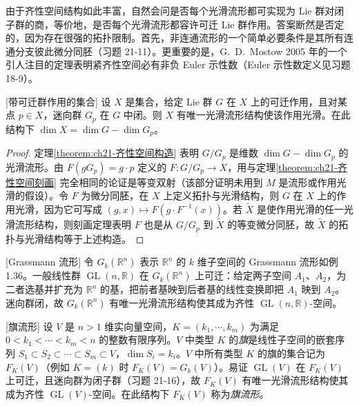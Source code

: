 \documentclass[../../main.tex]{subfiles}
\begin{document}
由于齐性空间结构如此丰富，自然会问是否每个光滑流形都可实现为 Lie 群对闭子群的商，等价地，是否每个光滑流形都容许可迁 Lie 群作用。答案断然是否定的，因为存在很强的拓扑限制。首先，非连通流形的一个简单必要条件是其所有连通分支彼此微分同胚（习题 21-11）。更重要的是，G.~D.~Mostow 2005 年的一个引人注目的定理表明紧齐性空间必有非负 Euler 示性数（Euler 示性数定义见习题 18-9）。

\begin{theorem}{[带可迁群作用的集合]}\label{theorem:ch21-可迁作用集合}
设 $X$ 是集合，给定 Lie 群 $G$ 在 $X$ 上的可迁作用，且对某点 $p\in X$，迷向群 $G_p$ 在 $G$ 中闭。则 $X$ 有唯一光滑流形结构使该作用光滑。在此结构下 $\dim X=\dim G-\dim G_p$。
\end{theorem}

\begin{proof}
定理\cref{theorem:ch21-齐性空间构造} 表明 $G/G_p$ 是维数 $\dim G-\dim G_p$ 的光滑流形。由 $F(gG_p)=g\cdot p$ 定义的 $F\colon G/G_p\to X$，用与定理\cref{theorem:ch21-齐性空间刻画} 完全相同的论证是等变双射（该部分证明未用到 $M$ 是流形或作用光滑的假设）。令 $F$ 为微分同胚，在 $X$ 上定义拓扑与光滑结构，则 $G$ 在 $X$ 上的作用光滑，因为它可写成 $(g,x)\mapsto F(g\cdot F^{-1}(x))$。若 $\widetilde X$ 是使作用光滑的任一光滑流形结构，则刻画定理表明 $F$ 也是从 $G/G_p$ 到 $\widetilde X$ 的等变微分同胚，故 $\widetilde X$ 的拓扑与光滑结构等于上述构造。
\end{proof}

\begin{example}{[Grassmann 流形]}\label{example:ch21-Grassmann}
令 $G_k(\mathbb{R}^n)$ 表示 $\mathbb{R}^n$ 的 $k$ 维子空间的 Grassmann 流形如例 1.36。一般线性群 $\operatorname{GL}(n,\mathbb{R})$ 在 $G_k(\mathbb{R}^n)$ 上可迁：给定两子空间 $A_1$、$A_2$，为二者选基并扩充为 $\mathbb{R}^n$ 的基，把前者基映到后者基的线性变换即把 $A_1$ 映到 $A_2$。迷向群闭，故 $G_k(\mathbb{R}^n)$ 有唯一光滑流形结构使其成为齐性 $\operatorname{GL}(n,\mathbb{R})$-空间。
\end{example}

\begin{example}{[旗流形]}\label{example:ch21-旗流形}
设 $V$ 是 $n>1$ 维实向量空间，$K=(k_1,\cdots ,k_m)$ 为满足 $0<k_1<\cdots<k_m<n$ 的整数有限序列。$V$ 中类型 $K$ 的\emph{旗}是线性子空间的嵌套序列 $S_1\subset S_2\subset\cdots\subset S_m\subset V$，$\dim S_i=k_i$。$V$ 中所有类型 $K$ 的旗的集合记为 $F_K(V)$（例如 $K=(k)$ 时 $F_K(V)=G_k(V)$）。易证 $\operatorname{GL}(V)$ 在 $F_K(V)$ 上可迁，且迷向群为闭子群（习题 21-16），故 $F_K(V)$ 有唯一光滑流形结构使其成为齐性 $\operatorname{GL}(V)$-空间。在此结构下 $F_K(V)$ 称为\emph{旗流形}。
\end{example}
\end{document}
